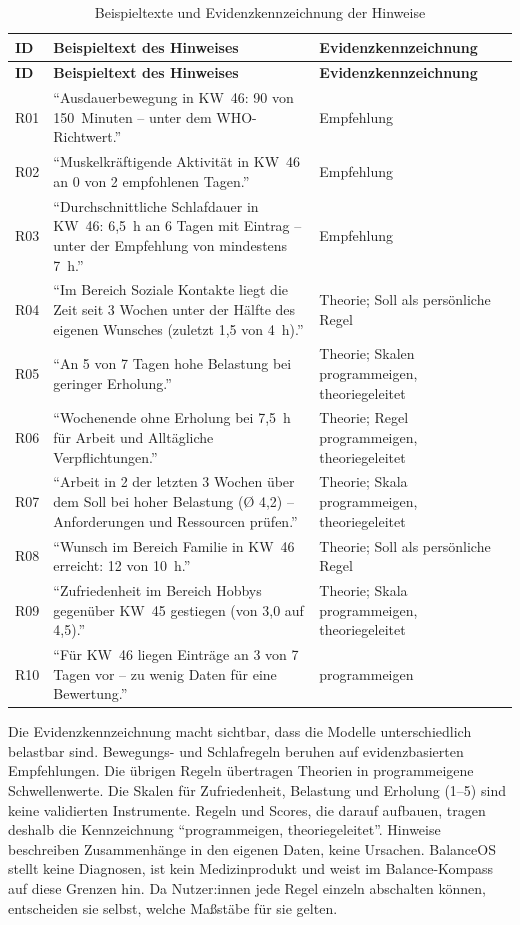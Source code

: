 \begin{longtable}{@{}L{1.0cm}L{9.6cm}L{4.6cm}@{}}
  \caption{Beispieltexte und Evidenzkennzeichnung der Hinweise}\label{tab:hinweistexte}\\
  \toprule
  \textbf{ID} & \textbf{Beispieltext des Hinweises} & \textbf{Evidenzkennzeichnung} \\
  \midrule
  \endfirsthead
  \toprule
  \textbf{ID} & \textbf{Beispieltext des Hinweises} & \textbf{Evidenzkennzeichnung} \\
  \midrule
  \endhead
  \bottomrule
  \endfoot
  R01 & \enquote{Ausdauerbewegung in KW~46: 90 von 150~Minuten -- unter dem WHO-Richtwert.} & Empfehlung \\
  R02 & \enquote{Muskelkräftigende Aktivität in KW~46 an 0 von 2 empfohlenen Tagen.} & Empfehlung \\
  R03 & \enquote{Durchschnittliche Schlafdauer in KW~46: 6,5~h an 6 Tagen mit Eintrag -- unter der Empfehlung von mindestens 7~h.} & Empfehlung \\
  R04 & \enquote{Im Bereich Soziale Kontakte liegt die Zeit seit 3 Wochen unter der Hälfte des eigenen Wunsches (zuletzt 1,5 von 4~h).} & Theorie; Soll als persönliche Regel \\
  R05 & \enquote{An 5 von 7 Tagen hohe Belastung bei geringer Erholung.} & Theorie; Skalen programmeigen, theoriegeleitet \\
  R06 & \enquote{Wochenende ohne Erholung bei 7,5~h für Arbeit und Alltägliche Verpflichtungen.} & Theorie; Regel programmeigen, theoriegeleitet \\
  R07 & \enquote{Arbeit in 2 der letzten 3 Wochen über dem Soll bei hoher Belastung (Ø 4,2) -- Anforderungen und Ressourcen prüfen.} & Theorie; Skala programmeigen, theoriegeleitet \\
  R08 & \enquote{Wunsch im Bereich Familie in KW~46 erreicht: 12 von 10~h.} & Theorie; Soll als persönliche Regel \\
  R09 & \enquote{Zufriedenheit im Bereich Hobbys gegenüber KW~45 gestiegen (von 3,0 auf 4,5).} & Theorie; Skala programmeigen, theoriegeleitet \\
  R10 & \enquote{Für KW~46 liegen Einträge an 3 von 7 Tagen vor -- zu wenig Daten für eine Bewertung.} & programmeigen \\
\end{longtable}

Die Evidenzkennzeichnung macht sichtbar, dass die Modelle unterschiedlich belastbar sind. Bewegungs- und Schlafregeln beruhen auf evidenzbasierten Empfehlungen. Die übrigen Regeln übertragen Theorien in programmeigene Schwellenwerte. Die Skalen für Zufriedenheit, Belastung und Erholung (1--5) sind keine validierten Instrumente. Regeln und Scores, die darauf aufbauen, tragen deshalb die Kennzeichnung \enquote{programmeigen, theoriegeleitet}. Hinweise beschreiben Zusammenhänge in den eigenen Daten, keine Ursachen. BalanceOS stellt keine Diagnosen, ist kein Medizinprodukt und weist im Balance-Kompass auf diese Grenzen hin. Da Nutzer:innen jede Regel einzeln abschalten können, entscheiden sie selbst, welche Maßstäbe für sie gelten.
